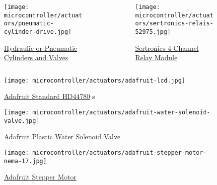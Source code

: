 \documentclass[aspectratio=169]{beamer}
\begin{document}
\begin{frame}
    \begin{columns}[t]
        \begin{column}{0.5\textwidth}
            \begin{figure}
                \texttt{[image: microcontroller/actuators/pneumatic-cylinder-drive.jpg]}
                \caption{\href{https://hpcontrol.eu/silownik-pneumatyczny-naped-32x200-sc.html}{Hydraulic or Pneumatic Cylinders and Valves}}
            \end{figure}
        \end{column}
        \begin{column}{0.5\textwidth}
            \begin{figure}
                \texttt{[image: microcontroller/actuators/sertronics-relais-52975.jpg]}
                \caption{\href{https://b2b.sertronics-shop.de/Sensoren-/-Module/Relaiskarten/5V-4-Kanal-Relais-Modul/}{Sertronics 4 Channel Relay Module}}
            \end{figure}
        \end{column}
    \end{columns}
    \begin{figure}
        \texttt{[image: microcontroller/actuators/adafruit-lcd.jpg]}
        \caption{\href{https://www.adafruit.com/product/181}{Adafruit Standard HD44780} s}
    \end{figure}
\end{frame}

\begin{frame}
    \begin{figure}
        \texttt{[image: microcontroller/actuators/adafruit-water-solenoid-valve.jpg]}
        \caption{\href{https://www.adafruit.com/product/997}{Adafruit Plastic Water Solenoid Valve}}
    \end{figure}
    \begin{figure}
        \texttt{[image: microcontroller/actuators/adafruit-stepper-motor-nema-17.jpg]}
        \caption{\href{https://www.adafruit.com/product/324}{Adafruit Stepper Motor}}
    \end{figure}
\end{frame}
\end{document}

